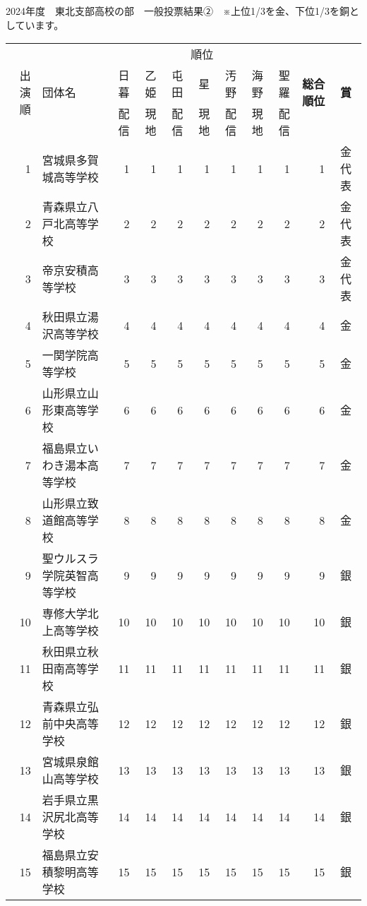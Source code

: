 \documentclass[11pt,a4paper,landscape,twoside,openany,english,uplatex]{jsarticle}
\begin{document}
\clearpage
2024年度　東北支部高校の部　一般投票結果②　※上位1/3を金、下位1/3を銅としています。
\begin{table}[h]
 \centering
 \begin{tabular}{r|l||rrrrrrr|r|c}
  \hline
  \multirow{3}{*}{出演順} & \multirow{3}{*}{団体名} & \multicolumn{7}{|c|}{順位} & \multirow{3}{*}{\textbf{総合順位}} &  \multirow{3}{*}{\textbf{賞}} \\
  \cline{3-9} %
    &  & 日暮 & 乙姫 & 屯田 & 星   & 汚野 & 海野 & 聖羅 & & \\
    &  & 配信 & 現地 & 配信 & 現地 & 配信 & 現地 & 配信 & &  \\
  \hline \hline
   1 & 宮城県多賀城高等学校         &   1 &  1 &  1 &  1 &  1 &  1 &  1 &  1 & 金代表 \\
   2 & 青森県立八戸北高等学校       &   2 &  2 &  2 &  2 &  2 &  2 &  2 &  2 & 金代表 \\
   3 & 帝京安積高等学校             &   3 &  3 &  3 &  3 &  3 &  3 &  3 &  3 & 金代表 \\
   4 & 秋田県立湯沢高等学校         &   4 &  4 &  4 &  4 &  4 &  4 &  4 &  4 & 金 \\
   5 & 一関学院高等学校             &   5 &  5 &  5 &  5 &  5 &  5 &  5 &  5 & 金 \\
   6 & 山形県立山形東高等学校       &   6 &  6 &  6 &  6 &  6 &  6 &  6 &  6 & 金 \\
   7 & 福島県立いわき湯本高等学校   &   7 &  7 &  7 &  7 &  7 &  7 &  7 &  7 & 金 \\
   8 & 山形県立致道館高等学校       &   8 &  8 &  8 &  8 &  8 &  8 &  8 &  8 & 金 \\
  \hline                                                                      
   9 & 聖ウルスラ学院英智高等学校   &   9 &  9 &  9 &  9 &  9 &  9 &  9 &  9 & 銀 \\
  10 & 専修大学北上高等学校         &  10 & 10 & 10 & 10 & 10 & 10 & 10 & 10 & 銀 \\
  11 & 秋田県立秋田南高等学校       &  11 & 11 & 11 & 11 & 11 & 11 & 11 & 11 & 銀 \\
  12 & 青森県立弘前中央高等学校     &  12 & 12 & 12 & 12 & 12 & 12 & 12 & 12 & 銀 \\
  13 & 宮城県泉館山高等学校         &  13 & 13 & 13 & 13 & 13 & 13 & 13 & 13 & 銀 \\
  14 & 岩手県立黒沢尻北高等学校     &  14 & 14 & 14 & 14 & 14 & 14 & 14 & 14 & 銀 \\
  15 & 福島県立安積黎明高等学校     &  15 & 15 & 15 & 15 & 15 & 15 & 15 & 15 & 銀 \\

\end{tabular}
\end{table}
\end{document}
